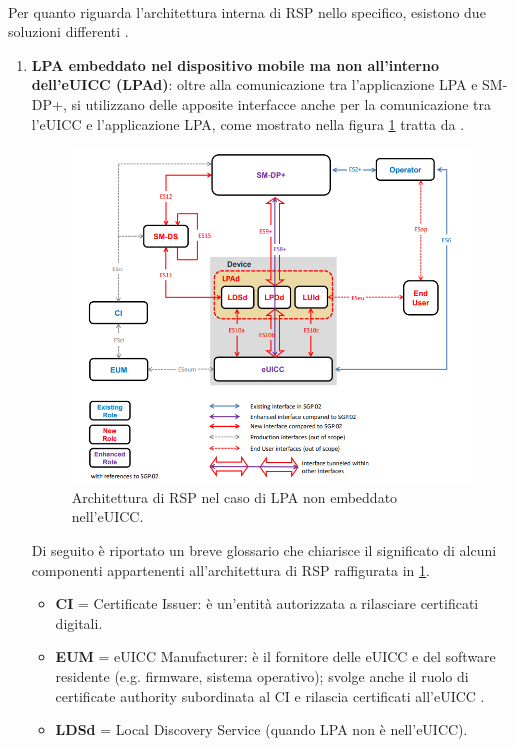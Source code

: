 \documentclass[10pt, twoside, openany]{book}
\begin{document}
\\Per quanto riguarda l'architettura interna di RSP nello specifico, esistono due soluzioni differenti \cite{GSMA-docs}.
\begin{enumerate}
\item \textbf{LPA embeddato nel dispositivo mobile ma non all'interno dell'eUICC (LPAd)}: oltre alla comunicazione tra l'applicazione LPA e SM-DP+, si utilizzano delle apposite interfacce anche per la comunicazione tra l'eUICC e l'applicazione LPA, come mostrato nella figura \ref{fig:RSP-LPAd} tratta da \cite{GSMA-docs}.
\begin{figure}
\includegraphics[width=\linewidth]{RSP-LPAd.png}
\caption{Architettura di RSP nel caso di LPA non embeddato nell'eUICC.}
\label{fig:RSP-LPAd}
\end{figure}
Di seguito è riportato un breve glossario che chiarisce il significato di alcuni componenti appartenenti all'architettura di RSP raffigurata in \ref{fig:RSP-LPAd}.
\begin{itemize}
\item \textbf{CI} = Certificate Issuer: è un'entità autorizzata a rilasciare certificati digitali.
\item \textbf{EUM} = eUICC Manufacturer: è il fornitore delle eUICC e del software residente (e.g. firmware, sistema operativo); svolge anche il ruolo di certificate authority subordinata al CI e rilascia certificati all'eUICC \cite{Sec-analysis}.
\item \textbf{LDSd} = Local Discovery Service (quando LPA non è nell'eUICC).

\end{itemize}
\end{enumerate}
\end{document}
